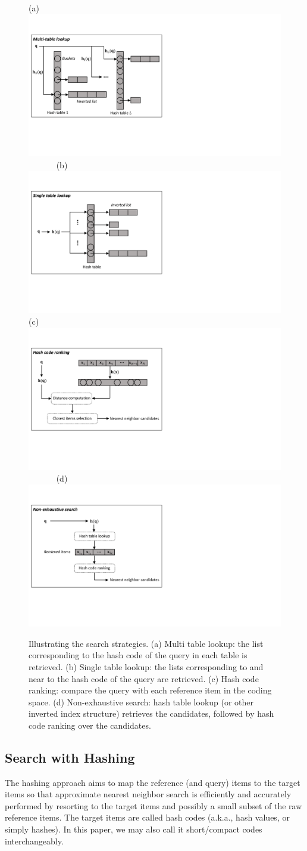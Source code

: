 \documentclass[10pt,journal,compsoc]{IEEEtran}
\begin{document}
\begin{figure}
\centering
(a)~{\includegraphics[width=.4\linewidth, clip]{figs/multiTableLookup}}~~~~~~
(b)~{\includegraphics[width=.4\linewidth, clip]{figs/singleTableLookup}}\\
(c)~{\includegraphics[width=.4\linewidth, clip]{figs/hashCodeRanking}}~~~~~~
(d)~{\includegraphics[width=.4\linewidth, clip]{figs/nonExhaustiveSearch}}
\caption{Illustrating the search strategies.
(a) Multi table lookup:
the list
corresponding to the hash code of the query
in each table
is retrieved.
(b) Single table lookup:
the lists corresponding to and near to the hash code
of the query are retrieved.
(c) Hash code ranking:
compare the query with each reference item
in the coding space.
(d) Non-exhaustive search:
hash table lookup (or other inverted index structure) retrieves the candidates,
followed by hash code ranking over the candidates.}
\label{fig:searchschemes}
\vspace{-.5cm}
\end{figure}

\subsection{Search with Hashing}
The hashing approach aims to
map the reference (and query) items
to the target items
so that approximate nearest neighbor search
is efficiently and accurately performed
by resorting to the target items and possibly
a small subset of the raw reference items.
The target items are
called hash codes
(a.k.a., hash values, or
simply hashes).
In this paper, we may also call it
short/compact codes interchangeably.
\end{document}
